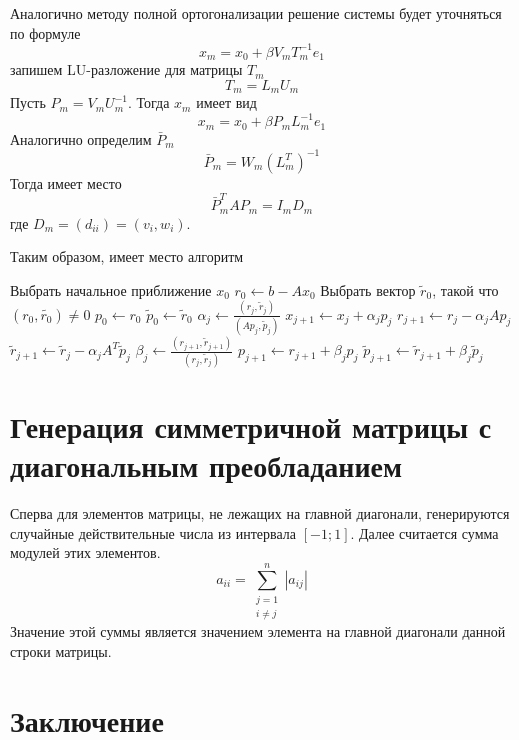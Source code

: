 \documentclass[a4paper, fontsize=14pt]{article}
\begin{document}
Аналогично методу полной ортогонализации решение системы будет уточняться по формуле
$$ x_m = x_0 +\beta V_m T_m^{-1} e_1 $$
запишем LU-разложение для матрицы $T_m$
$$ T_m =  L_m U_m $$
Пусть $P_m = V_m U_m^{-1}$. Тогда $x_m$ имеет вид
$$ x_m = x_0 + \beta P_m L_m^{-1} e_1 $$
Аналогично определим $\bar{P}_m$
$$ \bar{P}_m = W_m (L_m^T)^{-1} $$
Тогда имеет место
$$ \bar{P}_m^T A P_m = I_m  D_m $$ 
где $D_m = (d_{ii}) = (v_i,w_i)$.

Таким образом, имеет место алгоритм
\begin{algorithm}
\begin{algorithmic}
    \State Выбрать начальное приближение $x_0$
    \State $r_0 \gets b - Ax_0$
    \State Выбрать вектор $\tilde{r}_0$, такой что $(r_0,\tilde{r_0}) \neq 0$
    \State $p_0 \gets r_0$
    \State $\tilde{p}_0 \gets \tilde{r}_0$
        \State $\alpha_j \gets \frac{(r_j,\tilde{r}_j)}{(Ap_j,\tilde{p}_j)}$
        \State $x_{j+1} \gets x_{j} + \alpha_j p_j$
        \State $r_{j+1} \gets r_j - \alpha_j A p_j$
        \State $\tilde{r}_{j+1} \gets \tilde{r}_j - \alpha_j A^T \tilde{p}_j$
        \State $\beta_j \gets \frac{(r_{j+1},\tilde{r}_{j+1})}{(r_j,\tilde{r}_j)}$
        \State $ p_{j+1} \gets r_{j+1}+\beta_j p_j$
        \State $ \tilde{p}_{j+1} \gets \tilde{r}_{j+1}+\beta_j \tilde{p}_j$
    \EndFor

\end{algorithmic}

\end{algorithm}
\section{Генерация симметричной матрицы с диагональным преобладанием}
Сперва для элементов матрицы, не лежащих на главной диагонали, генерируются случайные действительные
числа из интервала $[-1;1]$. Далее считается сумма модулей этих элементов. 
$$
    a_{ii} = \sum^{n}_{\substack{j=1\\ i \neq j}} |a_{ij}| 
$$
Значение этой суммы является значением элемента на главной диагонали данной строки матрицы. 




\newpage

\section*{Заключение}

\newpage


\begin{thebibliography}{5}
\end{thebibliography}
\end{document}

